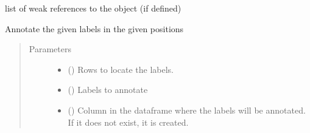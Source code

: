 \documentclass[letterpaper,10pt,english]{sphinxmanual}
\begin{document}
\begin{fulllineitems}
\begin{fulllineitems}
\label{\detokenize{dc_classifier:src.domain_classifier.classifier.CorpusClassifier.__weakref__}}
\sphinxAtStartPar
list of weak references to the object (if defined)

\end{fulllineitems}


\begin{fulllineitems}
\label{\detokenize{dc_classifier:src.domain_classifier.classifier.CorpusClassifier.annotate}}
\sphinxAtStartPar
Annotate the given labels in the given positions
\begin{quote}\begin{description}
\item[{Parameters}] \leavevmode\begin{itemize}
\item {} 
\sphinxAtStartPar
{} () \textendash{} Rows to locate the labels.

\item {} 
\sphinxAtStartPar
{} () \textendash{} Labels to annotate

\item {} 
\sphinxAtStartPar
{} () \textendash{} Column in the dataframe where the labels will be annotated. If it
does not exist, it is created.

\end{itemize}

\end{description}\end{quote}

\end{fulllineitems}



\end{fulllineitems}
\end{document}
